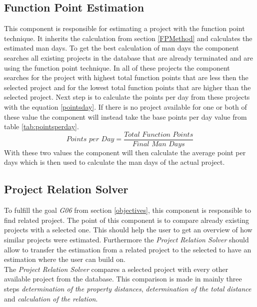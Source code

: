 \subsection{Function Point Estimation}\label{functionpointconcept}

This component is responsible for estimating a project with the function point technique. It inherits the calculation from section \ref{FPMethod} and calculates the estimated man days. To get the best calculation of man days the component searches all existing projects in the database that are already terminated and are using the function point technique. In all of these projects the component searches for the project with highest total function points that are less then the selected project and for the lowest total function points that are higher than the selected project. Next step is to calculate the points per day from these projects with the equation \ref{pointsday}. If there is no project available for one or both of these value the component will instead take the base points per day value from table \ref{tab:pointsperday}.
\begin{equation}
\textit{Points per Day} =  \frac{\textit{Total Function Points}}{\textit{Final Man Days}}\label{pointsday}
\end{equation}
With these two values the component will then calculate the average point per days which is then used to calculate the man days of the actual project.

\subsection{Project Relation Solver}\label{projectRealtionSolver}

To fulfill the goal \textit{G06} from section \ref{objectives}, this component is responsible to find related project. The point of this component is to compare already existing projects with a selected one. This should help the user to get an overview of how similar projects were estimated. Furthermore the \textit{Project Relation Solver} should allow to transfer the estimation from a related project to the selected to have an estimation where the user can build on.\\
The \textit{Project Relation Solver} compares a selected project with every other available project from the database. This comparison is made in mainly three steps \textit{determination of the property distances}, \textit{determination of the total distance} and \textit{calculation of the relation}.

